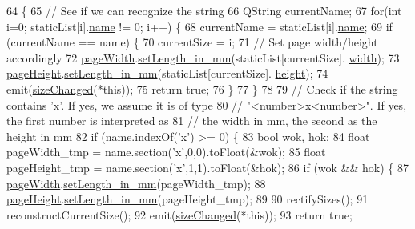 \begin{DoxyCode}
64 \{
65   \textcolor{comment}{// See if we can recognize the string}
66   QString currentName;
67   \textcolor{keywordflow}{for}(\textcolor{keywordtype}{int} i=0; staticList[i].\hyperlink{structpageSizeItem_aeabfea4a5413a25c81fa32cf0dde3d44}{name} != 0; i++) \{
68     currentName = staticList[i].\hyperlink{structpageSizeItem_aeabfea4a5413a25c81fa32cf0dde3d44}{name};
69     \textcolor{keywordflow}{if} (currentName == name) \{
70       currentSize = i;
71       \textcolor{comment}{// Set page width/height accordingly}
72       \hyperlink{classSimplePageSize_ad5aa26a1789bd7b20dbca509a50cfcab}{pageWidth}.\hyperlink{classLength_ae3aabced262567871a1df58c1a878b60}{setLength\_in\_mm}(staticList[currentSize].
      \hyperlink{classSimplePageSize_a5866f4c04635b09ec065a1fc45f9d1df}{width});
73       \hyperlink{classSimplePageSize_a0e0bc8a9833d9c276f96e6fda5c64cf7}{pageHeight}.\hyperlink{classLength_ae3aabced262567871a1df58c1a878b60}{setLength\_in\_mm}(staticList[currentSize].
      \hyperlink{classSimplePageSize_a8df6b43628bff9c8b53f26cc478640c5}{height});
74       emit(\hyperlink{classpageSize_ae49ee59892403f920d614d0c8d9daa5b}{sizeChanged}(*\textcolor{keyword}{this}));
75       \textcolor{keywordflow}{return} \textcolor{keyword}{true};
76     \}
77   \}
78 
79   \textcolor{comment}{// Check if the string contains 'x'. If yes, we assume it is of type}
80   \textcolor{comment}{// "<number>x<number>". If yes, the first number is interpreted as}
81   \textcolor{comment}{// the width in mm, the second as the height in mm}
82   \textcolor{keywordflow}{if} (name.indexOf(\textcolor{charliteral}{'x'}) >= 0) \{
83     \textcolor{keywordtype}{bool} wok, hok;
84     \textcolor{keywordtype}{float} pageWidth\_tmp  = name.section(\textcolor{charliteral}{'x'},0,0).toFloat(&wok);
85     \textcolor{keywordtype}{float} pageHeight\_tmp = name.section(\textcolor{charliteral}{'x'},1,1).toFloat(&hok);
86     \textcolor{keywordflow}{if} (wok && hok) \{
87       \hyperlink{classSimplePageSize_ad5aa26a1789bd7b20dbca509a50cfcab}{pageWidth}.\hyperlink{classLength_ae3aabced262567871a1df58c1a878b60}{setLength\_in\_mm}(pageWidth\_tmp);
88       \hyperlink{classSimplePageSize_a0e0bc8a9833d9c276f96e6fda5c64cf7}{pageHeight}.\hyperlink{classLength_ae3aabced262567871a1df58c1a878b60}{setLength\_in\_mm}(pageHeight\_tmp);
89 
90       rectifySizes();
91       reconstructCurrentSize();
92       emit(\hyperlink{classpageSize_ae49ee59892403f920d614d0c8d9daa5b}{sizeChanged}(*\textcolor{keyword}{this}));
93       \textcolor{keywordflow}{return} \textcolor{keyword}{true};

\end{DoxyCode}
